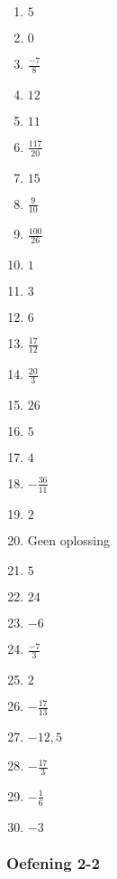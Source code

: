 {\begin{multicols}{3}
\begin{enumerate}[itemsep=1pt, label=\textbf{\arabic*}. ] 
\item $5$%
\item $0$%
\item $\frac{-7}{8}$ %
\item $12$%
\item $11$%
\item $\frac{117}{20}$%
\item$15$ %
\item$\frac{9}{10}$ %
\item $\frac{100}{26}$ %
\item $1$%
\item $3$%
\item $6$%
\item $\frac{17}{12}$%
\item $\frac{20}{3}$%
\item $26$%
\item $5$%
\item $4$%
\item $-\frac{36}{11}$%
\item $2$%
\item Geen oplossing%
\item $5$%
\item $24$%
\item $-6$%
\item $\frac{-7}{3}$%
\item $2$
\item $-\frac{17}{13}$
\item $-12,5$
\item $-\frac{17}{3}$
\item $-\frac{1}{6}$
\item $-3$
\end{enumerate}



\subsubsection*{Oefening 2-2} %


\end{multicols}}
